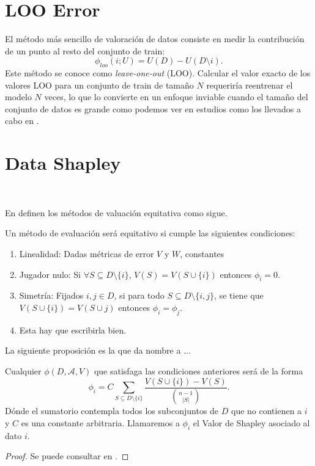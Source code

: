 \section{LOO Error}

El método más sencillo de valoración de datos consiste en medir la
contribución de un punto al resto del conjunto de train:
\[ \phi_{{loo}} (i ; U) = U (D) - U (D \setminus i) . \]
Este método se conoce como \textit{leave-one-out} (LOO). Calcular el
valor exacto de los valores LOO para un conjunto de train de tamaño $N$
requeriría reentrenar el modelo $N$ veces, lo que lo convierte en un
enfoque inviable cuando el tama{\~n}o del conjunto de datos es grande como
podemos ver en estudios como los llevados a cabo en {\cite{looFuck}}.

\section{Data Shapley}

\

En {\cite{shapleyValue}} definen los métodos de valuación equitativa
como sigue.

\begin{definition}
  Un método de evaluación será equitativo si cumple las siguientes
  condiciones:
  \begin{enumerate}
    
    
    \item Linealidad: Dadas métricas de error $V$ y $W$, constantes
    
    \item Jugador nulo: Si $\forall S \subseteq D \setminus \{ i \}$, $V (S)
    = V (S \cup \{ i \})$ entonces $\phi_i = 0$.
    
    \item Simetría: Fijados $i, j \in D$, si para todo $S \subseteq D
    \setminus \{ i, j \}$, se tiene que $V (S \cup \{ i \}) = V (S \cup j)$
    entonces $\phi_i = \phi_j$.
    
    \item Esta hay que escribirla bien.
  \end{enumerate}
\end{definition}

La siguiente proposición es la que da nombre a ...

\begin{proposition}
  Cualquier $\phi (D, \mathcal{A}, V)$ que satisfaga las condiciones
  anteriores será de la forma
  \[ \phi_i = C \sum_{S \subseteq D \setminus \{ i \}} \frac{V (S \cup \{ i
     \}) - V (S)}{\binom{n - 1}{| S |}} . \]
  Dónde el sumatorio contempla todos los subconjuntos de $D$ que no
  contienen a $i$ y $C$ es una constante arbitraria. Llamaremos a $\phi_i$ el
  Valor de Shapley asociado al dato $i$.
\end{proposition}

\begin{proof}
  Se puede consultar en {\cite{shapleyValue}}.
\end{proof}